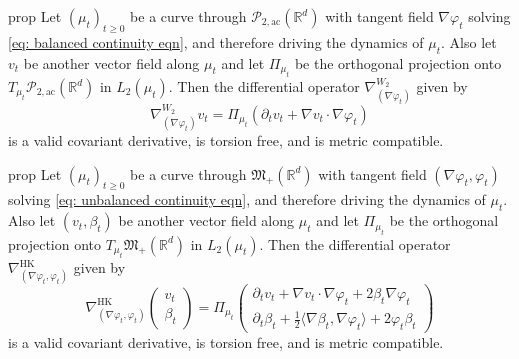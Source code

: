 \documentclass[11pt]{article}
\newcommand{\pac}{\mathcal{P}_{2, \text{ac}}(\mathbb{R}^d)}
\newcommand{\posm}{\mathfrak{M}_+(\mathbb{R}^d)}
\begin{document}
\begin{restatable}{prop}{} \label{Wasserstein covariant deriv}
    Let $(\mu_t)_{t\geq 0}$ be a curve through $\pac$ with tangent field $\nabla \varphi_t$ solving \cref{eq: balanced continuity eqn}, and therefore driving the dynamics of $\mu_t$. Also let $v_t$ be another vector field along $\mu_t$ and let $\Pi_{\mu_t}$ be the orthogonal projection onto $T_{\mu_t}\pac$ in $L_2(\mu_t)$. Then the differential operator $\nabla_{(\nabla\varphi_t)}^{W_2}$ given by
    \begin{equation*}
        \nabla_{(\nabla\varphi_t)}^{W_2}v_t = \Pi_{\mu_t}\left(\partial_t v_t + \nabla v_t \cdot \nabla \varphi_t\right)
    \end{equation*}
    is a valid covariant derivative, is torsion free, and is metric compatible. 
\end{restatable}

\begin{restatable}{prop}{} \label{HK covariant deriv}
    Let $(\mu_t)_{t\geq 0}$ be a curve through $\posm$ with tangent field $(\nabla \varphi_t, \varphi_t)$ solving \cref{eq: unbalanced continuity eqn}, and therefore driving the dynamics of $\mu_t$. Also let $(v_t, \beta_t)$ be another vector field along $\mu_t$ and let $\Pi_{\mu_t}$ be the orthogonal projection onto $T_{\mu_t}\posm$ in $L_2(\mu_t)$. Then the differential operator $\nabla_{(\nabla\varphi_t, \varphi_t)}^{\text{HK}}$ given by
    \begin{equation*}
        \nabla_{(\nabla\varphi_t, \varphi_t)}^{\text{HK}} \begin{pmatrix}
            v_t \\
            \beta_t
        \end{pmatrix} = \Pi_{\mu_t}\begin{pmatrix}
            \partial_t v_t + \nabla v_t \cdot \nabla \varphi_t + 2\beta_t\nabla\varphi_t \\
            \partial_t \beta_t + \frac{1}{2}\langle \nabla \beta_t, \nabla \varphi_t\rangle + 2\varphi_t\beta_t
        \end{pmatrix}
    \end{equation*}
    is a valid covariant derivative, is torsion free, and is metric compatible. 
\end{restatable}
\end{document}
